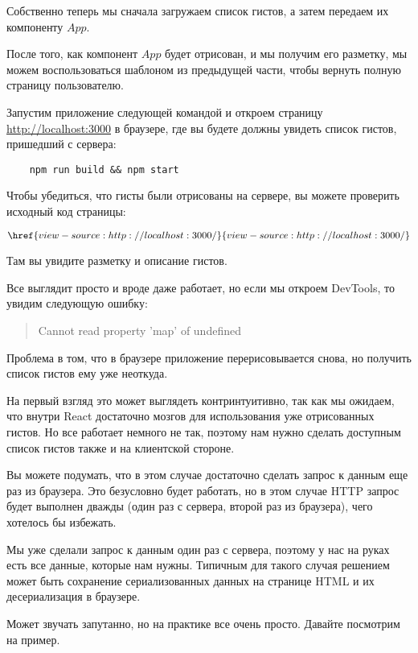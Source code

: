 Собственно теперь мы сначала загружаем список гистов, а затем передаем их компоненту $App$.

После того, как компонент $App$ будет отрисован, и мы получим его разметку, мы можем воспользоваться шаблоном из предыдущей части, чтобы вернуть полную страницу пользователю.

Запустим приложение следующей командой и откроем страницу \href{http://localhost:3000}{http://localhost:3000} в браузере, где вы будете должны увидеть список гистов, пришедший с сервера:

\begin{lstlisting}
	npm run build && npm start
\end{lstlisting}

Чтобы убедиться, что гисты были отрисованы на сервере, вы можете проверить исходный код страницы:

$$
\href{view-source:http://localhost:3000/}{view-source:http://localhost:3000/}
$$

Там вы увидите разметку и описание гистов.

Все выглядит просто и вроде даже работает, но если мы откроем DevTools, то увидим следующую ошибку:


\begin{quotation}
Cannot read property 'map' of undefined	
\end{quotation}

Проблема в том, что в браузере приложение перерисовывается снова, но получить список гистов ему уже неоткуда.

На первый взгляд это может выглядеть контринтуитивно, так как мы ожидаем, что внутри React достаточно мозгов для использования уже отрисованных гистов. Но все работает немного не так, поэтому нам нужно сделать доступным список гистов также и на клиентской стороне.

Вы можете подумать, что в этом случае достаточно сделать запрос к данным еще раз из браузера. Это безусловно будет работать, но в этом случае HTTP запрос будет выполнен дважды (один раз с сервера, второй раз из браузера), чего хотелось бы избежать. 

Мы уже сделали запрос к данным один раз с сервера, поэтому у нас на руках есть все данные, которые нам нужны. Типичным для такого случая решением может быть сохранение сериализованных данных на странице HTML и их десериализация в браузере.

Может звучать запутанно, но на практике все очень просто. Давайте посмотрим на пример.

